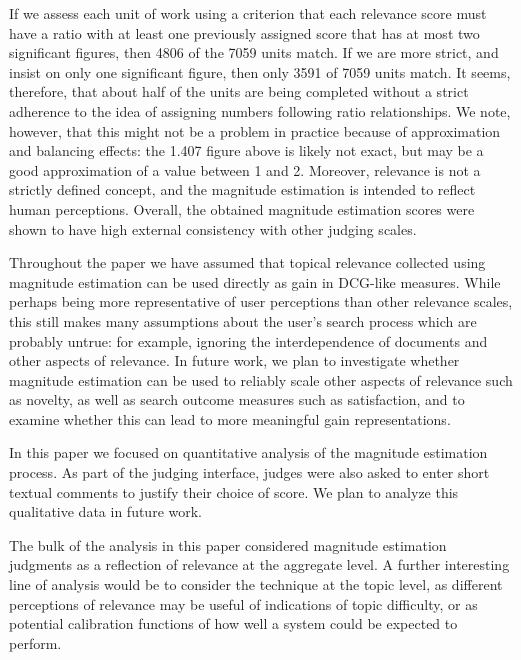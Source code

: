 If we assess each unit of work using a criterion that each relevance
score must have a ratio with at least one previously assigned score
that has at most two significant figures, then 4806 of the
7059 units match.
If we are more strict, and insist on only one significant figure, then
only 3591 of 7059 units match.
It seems, therefore, that about half of the units are being completed
without a strict adherence to the idea of assigning numbers following 
ratio relationships.
We note, however, that this might not be a problem in practice because of
approximation and balancing effects: the 1.407 figure above is likely
not exact, but may be a good approximation of a value between 1 and 2.
Moreover, relevance is not a strictly defined concept, and the magnitude
estimation is intended to reflect human perceptions.
Overall, the obtained magnitude estimation scores
were shown to have high external consistency with other judging scales.

Throughout the paper we have assumed that topical relevance collected
using magnitude estimation can be used directly as gain in DCG-like
measures.
While perhaps being more representative of user perceptions than other
relevance scales, this still makes many assumptions about the user's
search process which are probably untrue: for example, ignoring the
interdependence of documents and other aspects of relevance.
In future work, we plan to investigate whether magnitude estimation can
be used to reliably scale other aspects of relevance such as novelty,
as well as search outcome measures such as satisfaction, and to examine
whether this can lead to more meaningful gain representations.

In this paper we focused on quantitative analysis of the magnitude
estimation process. As part of the judging interface, judges were also
asked to enter short textual comments to justify their choice of score.
We plan to analyze this qualitative data in future work.

The bulk of the analysis in this paper considered magnitude estimation
judgments as a reflection of relevance at the aggregate level. 
A further interesting line of analysis would be to consider the
technique at the topic level, as different perceptions of relevance may
be useful of indications of topic difficulty, or as potential
calibration functions of how well a system could be expected to perform.

